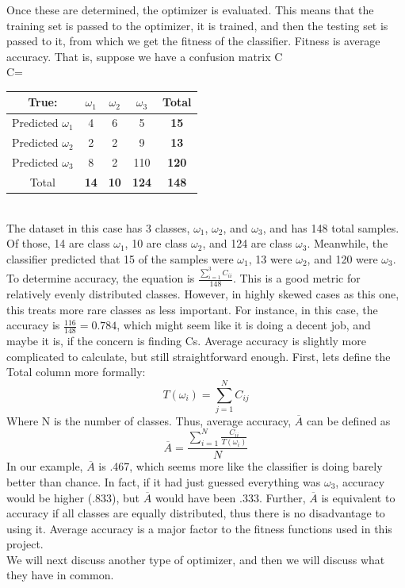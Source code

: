 Once these are determined, the optimizer is evaluated.  This means that the training set is passed to the optimizer, it is trained, and then the testing set is passed to it, from which we get the fitness of the classifier.  Fitness is average accuracy.  That is, suppose we have a confusion matrix C\\
C= \begin{tabular}{|c|c|c|c|c|}
	\hline
	True:&$\omega_1$&$\omega_2$&$\omega_3$&\textbf{Total}\\
	\hline
	Predicted $\omega_1$&4&6&5&\textbf{15}\\
	\hline
	Predicted $\omega_2$&2&2&9&\textbf{13}\\
	\hline
	Predicted $\omega_3$&8&2&110&\textbf{120}\\
	\hline
	Total&\textbf{14}&\textbf{10}&\textbf{124}&\textbf{148}\\
	\hline
\end{tabular} 
\\The dataset in this case has 3 classes, $\omega_1$, $\omega_2$, and $\omega_3$, and has 148 total samples.  Of those, 14 are class $\omega_1$, 10 are class $\omega_2$, and 124 are class $\omega_3$.  Meanwhile, the classifier predicted that 15 of the samples were $\omega_1$, 13 were $\omega_2$, and 120 were $\omega_3$.  To determine accuracy, the equation is $\frac{\sum_{i=1}^{3}C_{ii}}{148}$.  This is a good metric for relatively evenly distributed classes.  However, in highly skewed cases as this one, this treats more rare classes as less important.  For instance, in this case, the accuracy is $\frac{116}{148} = 0.784$, which might seem like it is doing a decent job, and maybe it is, if the concern is finding Cs.  Average accuracy is slightly more complicated to calculate, but still straightforward enough.  First, lets define the Total column more formally: $$T(\omega_i)=\sum_{j=1}^{N}C_{ij}$$
Where N is the number of classes.  Thus, average accuracy, $\overline{A}$ can be defined as $$\overline{A} = \frac{\sum_{i=1}^{N}\frac{C_{ii}}{T(\omega_i)}} {N}$$
In our example, $\overline{A}$ is .467, which seems more like the classifier is doing barely better than chance.  In fact, if it had just guessed everything was $\omega_3$, accuracy would be higher (.833), but $\overline{A}$ would have been .333.  Further, $\overline{A}$ is equivalent to accuracy if all classes are equally distributed, thus there is no disadvantage to using it.  Average accuracy is a major factor to the fitness functions used in this project.\\
We will next discuss another type of optimizer, and then we will discuss what they have in common.

